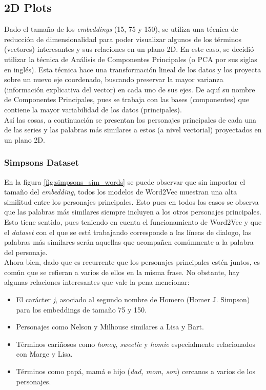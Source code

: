 \subsection{2D Plots}

Dado el tamaño de los \textit{embeddings} (15, 75 y 150), se utiliza una técnica de reducción de dimensionalidad para poder visualizar algunos de los términos (vectores) interesantes y sus relaciones en un plano 2D. En este caso, se decidió utilizar la técnica de Análisis de Componentes Principales (o PCA por sus siglas en inglés). Esta técnica hace una transformación lineal de los datos y los proyecta sobre un nuevo eje coordenado, buscando preservar la mayor varianza (información explicativa del vector) en cada uno de sus ejes. De aquí su nombre de Componentes Principales, pues se trabaja con las bases (componentes) que contiene la mayor variabilidad de los datos (principales). \\

Así las cosas, a continuación se presentan los personajes principales de cada una de las series y las palabras más similares a estos (a nivel vectorial) proyectados en un plano 2D.

\subsubsection{Simpsons Dataset}

En la figura \ref{fig:simpsons_sim_words} se puede observar que sin importar el tamaño del \textit{embedding}, todos los modelos de Word2Vec muestran una alta similitud entre los personajes principales. Esto pues en todos los casos se observa que las palabras más similares siempre incluyen a los otros personajes principales. Esto tiene sentido, pues teniendo en cuenta el funcionamiento de Word2Vec y que el \textit{dataset} con el que se está trabajando corresponde a las líneas de dialogo, las palabras más similares serán aquellas que acompañen comúnmente a la palabra del personaje. \\

Ahora bien, dado que es recurrente que los personajes principales estén juntos, es común que se refieran a varios de ellos en la misma frase. No obstante, hay algunas relaciones interesantes que vale la pena mencionar: 

\begin{itemize}
    \item El carácter \textit{j}, asociado al segundo nombre de Homero (Homer J. Simpson) para los embeddings de tamaño 75 y 150.
    
    \item Personajes como Nelson y Milhouse similares a Lisa y Bart.
    
    \item Términos cariñosos como \textit{honey}, \textit{sweetie} y \textit{homie} especialmente relacionados con Marge y Lisa.
    
    \item Términos como papá, mamá e hijo (\textit{dad, mom, son}) cercanos a varios de los personajes.
\end{itemize}

